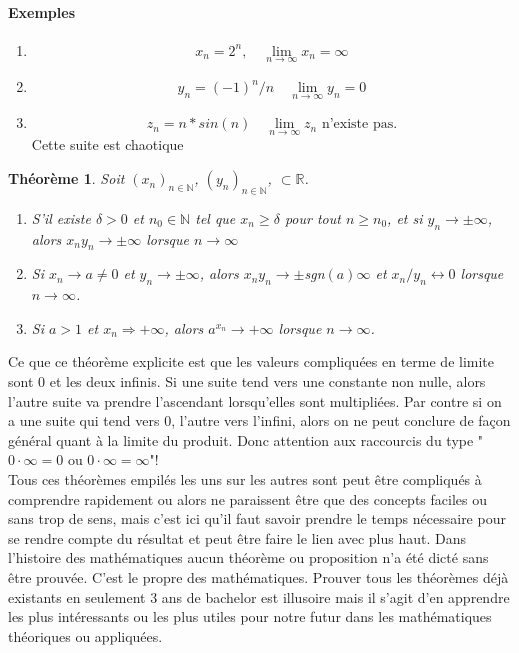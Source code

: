 \documentclass[oneside,12pt,french,table]{book}
\theoremstyle{definition}
\theoremstyle{plain}
\newtheorem{theorem}[definition]{Théorème}
\theoremstyle{remark}
\newcommand{\Nn}{{\mathbb{N}}}
\newcommand{\Rr}{{\mathbb{R}}}
\begin{document}
\paragraph{Exemples}
\begin{enumerate}
    \item \[x_n=2^n, \quad \lim_{n\rightarrow\infty}x_n=\infty\]
    \item \[y_n=(-1)^n/n \quad \lim_{n\rightarrow\infty}y_n=0\]
    \item \[z_n=n*sin(n) \quad \lim_{n\rightarrow\infty}z_n \text{ n'existe pas.}\]  Cette suite est chaotique
    
\end{enumerate}
\begin{theorem}
    Soit $(x_n)_{n\in\Nn}$, $(y_n)_{n\in\Nn}$,  $\subset \Rr$.
\begin{enumerate}
    \item S'il existe $\delta >0$ et $n_0\in\Nn$ tel que $x_n\geq \delta$ pour tout $n\geq n_0$, et si $y_n\longrightarrow\pm \infty$, alors $x_ny_n\longrightarrow\pm\infty$ lorsque $n\longrightarrow\infty$
    \item Si $x_n\longrightarrow a\neq 0$ et $y_n\longrightarrow \pm \infty$, alors $x_ny_n\longrightarrow\pm$sgn$(a)\infty$ et $x_n/y_n\longleftrightarrow 0$ lorsque $n\rightarrow\infty$.
    \item Si $a>1$ et $x_n\Longrightarrow + \infty$, alors $a^{x_n}\rightarrow +\infty $ lorsque $n\rightarrow\infty$. 
\end{enumerate}
\end{theorem}
Ce que ce théorème explicite est que les valeurs compliquées en terme de limite sont 0 et les deux infinis. Si une suite tend vers une constante non nulle, alors l'autre suite va prendre l'ascendant lorsqu'elles sont multipliées. Par contre si on a une suite qui tend vers 0, l'autre vers l'infini, alors on ne peut conclure de façon général quant à la limite du produit. Donc attention aux raccourcis du type "$0\cdot \infty=0$ ou $0\cdot \infty=\infty$"!\\


Tous ces théorèmes empilés les uns sur les autres sont peut être compliqués à comprendre rapidement ou alors ne paraissent être que des concepts faciles ou sans trop de sens, mais c'est ici qu'il faut savoir prendre le temps nécessaire pour se rendre compte du résultat et peut être faire le lien avec plus haut. Dans l'histoire des mathématiques aucun théorème ou proposition n'a été dicté sans être prouvée. C'est le propre des mathématiques. Prouver tous les théorèmes déjà existants en seulement 3 ans de bachelor est illusoire mais il s'agit d'en apprendre les plus intéressants ou les plus utiles pour notre futur dans les mathématiques théoriques ou appliquées. \\
\end{document}
